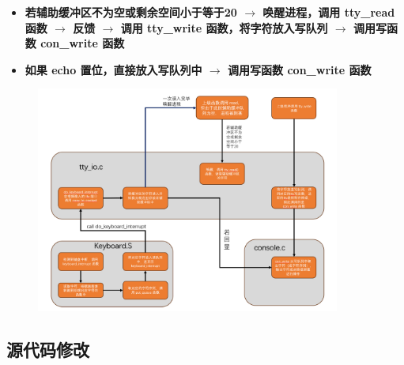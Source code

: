             \begin{itemize}
                \item \textbf{若辅助缓冲区不为空或剩余空间小于等于20 $\rightarrow$ 唤醒进程，调用 tty\_read 函数 $\rightarrow$ 反馈 $\rightarrow$ 调用 tty\_write 函数，将字符放入写队列 $\rightarrow$ 调用写函数 con\_write 函数}
                \item \textbf{如果 echo 置位，直接放入写队列中 $\rightarrow$ 调用写函数 con\_write 函数}
            \end{itemize}
            \begin{figure}[htbp]
                \hspace*{1.5cm}
                \includegraphics*[width = 10cm]{s1_7.png}
            \end{figure}
    \subsection{源代码修改}
